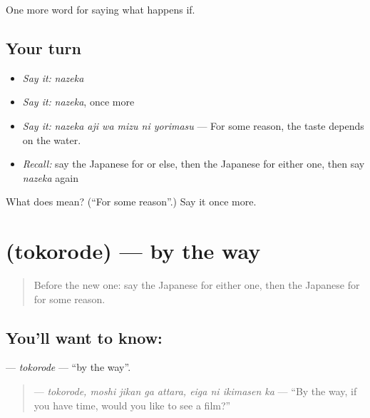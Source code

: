 \begin{grammarlens}[title={What you've built}]
One more word for saying what happens if.
\end{grammarlens}

\subsection*{Your turn}
\begin{itemize}
\raggedright
  \item \emph{Say it:} \emph{nazeka}
  \item \emph{Say it:} \emph{nazeka}, once more
  \item \emph{Say it:} \emph{nazeka aji wa mizu ni yorimasu} — For some reason, the taste depends on the water.
  \item \emph{Recall:} say the Japanese for or else, then the Japanese for either one, then say \emph{nazeka} again
\end{itemize}

\begin{tcolorbox}[breakable,colback=teal!4,colframe=teal!35!black,title={Before you move on}]
What does  mean? (\textquotedblleft{}For some reason\textquotedblright{}.) Say it once more.
\end{tcolorbox}
\section[\texorpdfstring{\ja{ところで} (tokorode)}{ところで (tokorode)}]{ (tokorode) — by the way}

\label{lesson:JA-C529-tokorode}



\begin{quote}
Before the new one: say the Japanese for either one, then the Japanese for for some reason.
\end{quote}

\subsection*{You'll want to know: }
\textbf{} — \emph{tokorode} — \textquotedblleft{}by the way\textquotedblright{}.

\begin{quote}
\textbf{   } — \emph{tokorode, moshi jikan ga attara, eiga ni ikimasen ka} — \textquotedblleft{}By the way, if you have time, would you like to see a film?\textquotedblright{}
\end{quote}

